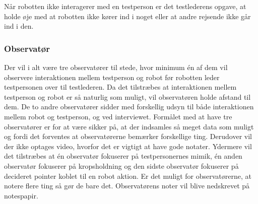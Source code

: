 Når robotten ikke interagerer med en testperson er det testlederens opgave, at holde øje med at robotten ikke kører ind i noget eller at andre rejsende ikke går ind i den.    

\subsubsection*{Observatør}
Der vil i alt være tre observatører til stede, hvor minimum én af dem vil observere interaktionen mellem testperson og robot før robotten leder testpersonen over til testlederen. Da det tilstræbes at interaktionen mellem testperson og robot er så naturlig som muligt, vil observatøren holde afstand til dem. De to andre observatører sidder med forskellig udsyn til både interaktionen mellem robot og testperson, og ved interviewet. Formålet med at have tre observatører er for at være sikker på, at der indsamles så meget data som muligt og fordi det forventes at observatørerne bemærker forskellige ting. Derudover vil der ikke optages video, hvorfor det er vigtigt at have gode notater. Ydermere vil det tilstræbes at én observatør fokuserer på testpersonernes mimik, én anden observatør fokuserer på kropsholdning og den sidste observatør fokuserer på decideret pointer koblet til en robot aktion. Er det muligt for observatørerne, at notere flere ting så gør de bare det. Observatørens noter vil blive nedskrevet på notespapir. 
